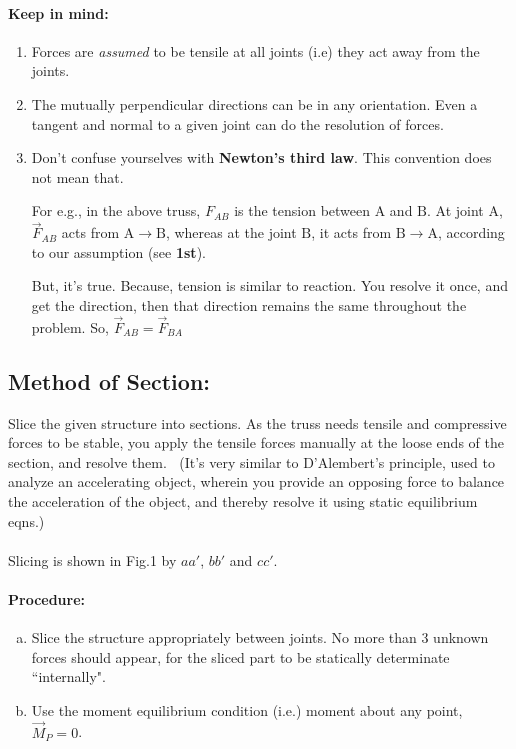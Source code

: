 \documentclass{article}
\begin{document}
{\paragraph{\Large Keep in mind:}
\begin{enumerate}[1)]
\item Forces are \textit{assumed} to be tensile at all joints (i.e) they act away from the joints.
\item The mutually perpendicular directions can be in any orientation. Even a tangent and normal to a given joint can do the resolution of forces.
\item Don't confuse yourselves with \textbf{Newton's third law}. This convention does not mean that.

For e.g., in the above truss, $F_{AB}$ is the tension between $\mathrm A$ and $\mathrm B$. At joint $\mathrm A$, $\vec F_{AB}$ acts from $\mathrm A\to\mathrm B$, whereas at the joint $\mathrm B$, it acts from $\mathrm B\to\mathrm A$, according to our assumption (see \textbf{1st}).

But, it's true. Because, tension is similar to reaction. You resolve it once, and get the direction, then that direction remains the same throughout the problem. So, $\vec F_{AB}=\vec F_{BA}$
\end{enumerate}
\subsection{\LARGE Method of Section:}
Slice the given structure into sections. As the truss needs tensile and compressive forces to be stable, you apply the tensile forces manually at the loose ends of the section, and resolve them.
\newpage
$\ $
(It's very similar to D'Alembert's principle, used to analyze an accelerating object, wherein you provide an opposing force to balance the acceleration of the object, and thereby resolve it using static equilibrium eqns.)
\\
\\
Slicing is shown in Fig.1 by $aa'$, $bb'$ and $cc'$.

\paragraph{\Large Procedure:}
\begin{enumerate}[(a)]
\item Slice the structure appropriately between joints. No more than 3 unknown forces should appear, for the sliced part to be statically determinate ``internally".
\item Use the moment equilibrium condition (i.e.) moment about any point, $\vec M_P=0$.
\newline


\end{enumerate}}
\end{document}
